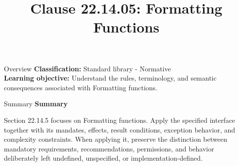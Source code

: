 \documentclass[10pt,letterpaper]{article}
\title{Clause 22.14.05: Formatting Functions}
\author{}
\date{}
\begin{document}
\maketitle
\begin{CornellOverviewBox}{Overview}
\textbf{Classification:} Standard library - Normative\\[2pt]
\textbf{Learning objective:} Understand the rules, terminology, and semantic consequences associated with Formatting functions.
\end{CornellOverviewBox}\begin{CornellSummaryBox}{Summary}
{\sffamily\bfseries\color{Accent} Summary}\par\vspace{3pt}Section 22.14.5 focuses on Formatting functions. Apply the specified interface together with its mandates, effects, result conditions, exception behavior, and complexity constraints. When applying it, preserve the distinction between mandatory requirements, recommendations, permissions, and behavior deliberately left undefined, unspecified, or implementation-defined.
\end{CornellSummaryBox}
\end{document}
